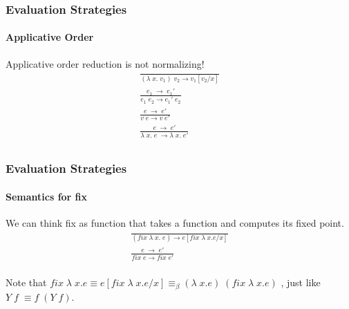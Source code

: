\documentclass[xcolor=table]{beamer}
\begin{document}
\begin{frame}
\frametitle{Evaluation Strategies}
\framesubtitle{Applicative Order}
\begin{block}{Applicative order reduction is not normalizing!}
\begin{gather*}
\frac{}{ (\lambda \;x.\;v_1)\;v_2\rightarrow v_1 [v_2/x]} \\[0.3cm]
\frac{e_1\;\rightarrow \;e_1'}{e_1 \; e_2 \rightarrow e_1' \; e_2} \\[0.3cm]
\frac{e\;\rightarrow\;e'}{v \; e \rightarrow v \; e'} \\[0.3cm]
\frac{e\;\rightarrow\;e'}{\lambda\;x.\;e\; \rightarrow \lambda \;x. \;e'} \\[0.3cm]
\end{gather*}
\end{block}
\end{frame}

\begin{frame}
\frametitle{Evaluation Strategies}
\framesubtitle{Semantics for fix}
\begin{block}{We can think fix as function that takes a function and computes its fixed point.}
\begin{gather*}
\frac{}{ (fix \; \lambda \;x.\;e) \rightarrow e[fix \; \lambda \; x. e/x]} \\[0.3cm]
\frac{e\;\rightarrow\;e'}{fix \; e \rightarrow fix \; e'} \\[0.3cm]
\end{gather*}

Note that $fix \; \lambda \; x. e \equiv e[fix \; \lambda \; x. e/x] \equiv_\beta (\lambda\; x. e) \; (fix \; \lambda \; x. e)$ ,
just like $Y \; f \; \equiv f \;(Y\; f)$.
\end{block}
\end{frame}
\end{document}
